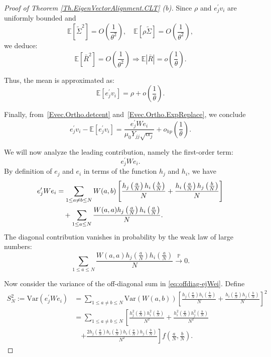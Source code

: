 \documentclass[11pt, reqno]{amsart}
\numberwithin{equation}{section}
\begin{document}
\begin{proof}[Proof of Theorem \ref{Th.EigenVectorAlignment.CLT} (b)]
Since \(\rho\) and \(e_j^\prime v_i\) are uniformly bounded and
\[
\mathbb{E}[\widetilde{\Sigma}^2] = {O}\left( \frac{1}{\theta^2} \right), 
\quad 
\mathbb{E}[\rho \widetilde{\Sigma}] = {O}\left( \frac{1}{\theta^2} \right),
\]
we deduce:
\[
\mathbb{E}[\bar{R}^2] = {O}\left( \frac{1}{\theta^2} \right) \Rightarrow \mathbb{E}|\bar{R}| = o\left( \frac{1}{\theta} \right).
\]

Thus, the mean is approximated as:
\begin{equation}
\label{Evec.Ortho.ExpReplace}
\mathbb{E}[e_j^\prime v_i] = \rho + o\left( \frac{1}{\theta} \right).
\end{equation}

Finally, from~\eqref{Evec.Ortho.detcent} and~\eqref{Evec.Ortho.ExpReplace}, we conclude
\begin{equation}
\label{Evec.Ortho.final}
e_j^\prime v_i - \mathbb{E}[e_j^\prime v_i] = \frac{e_j^\prime W e_i}{\mu_0 Y_{jj} \sqrt{\alpha_j}} + o_{hp}\left(\frac{1}{\theta}\right).
\end{equation}

We will now analyze the leading contribution, namely the first-order term:
\[
e_j^\prime W e_i.
\]
By definition of $e_j$ and $e_i$ in terms of the function $h_j$ and $h_i$, we have
\begin{align}
e_j^\prime W e_i &= \sum_{1 \le a \ne b \le N} W(a,b) \left[\frac{h_j\left(\frac{a}{N}\right) h_i\left(\frac{b}{N}\right)}{N} + \frac{h_i\left(\frac{a}{N}\right) h_j\left(\frac{b}{N}\right)}{N}\right] \notag \\
&\quad + \sum_{1 \le a \le N} \frac{W(a,a) h_j\left(\frac{a}{N}\right) h_i\left(\frac{a}{N}\right)}{N}. \label{eq:offdiag-ejWei}
\end{align}
The diagonal contribution vanishes in probability by the weak law of large numbers:
\[
\sum_{1 \le a \le N} \frac{W(a,a) h_j\left(\frac{a}{N}\right) h_i\left(\frac{a}{N}\right)}{N} \xrightarrow{\mathbb{P}} 0.
\]

Now consider the variance of the off-diagonal sum in \eqref{eq:offdiag-ejWei}. Define
\begin{align*}
S_N^2 := \mathrm{Var}(e_j^\prime W e_i) &= \sum_{1 \le a \ne b \le N} \mathrm{Var}(W(a,b)) \left[ \frac{h_j\left(\frac{a}{N}\right) h_i\left(\frac{b}{N}\right)}{N} + \frac{h_i\left(\frac{a}{N}\right) h_j\left(\frac{b}{N}\right)}{N} \right]^2 \\
&= \sum_{1 \le a \ne b \le N} \left[ \frac{h_j^2\left(\frac{a}{N}\right) h_i^2\left(\frac{b}{N}\right)}{N^2} + \frac{h_i^2\left(\frac{a}{N}\right) h_j^2\left(\frac{b}{N}\right)}{N^2} \right. \\
&\quad \left. + \frac{2 h_j\left(\frac{a}{N}\right) h_i\left(\frac{b}{N}\right) h_i\left(\frac{a}{N}\right) h_j\left(\frac{b}{N}\right)}{N^2} \right] f\left(\frac{a}{N}, \frac{b}{N}\right).
\end{align*}


\end{proof}
\end{document}

